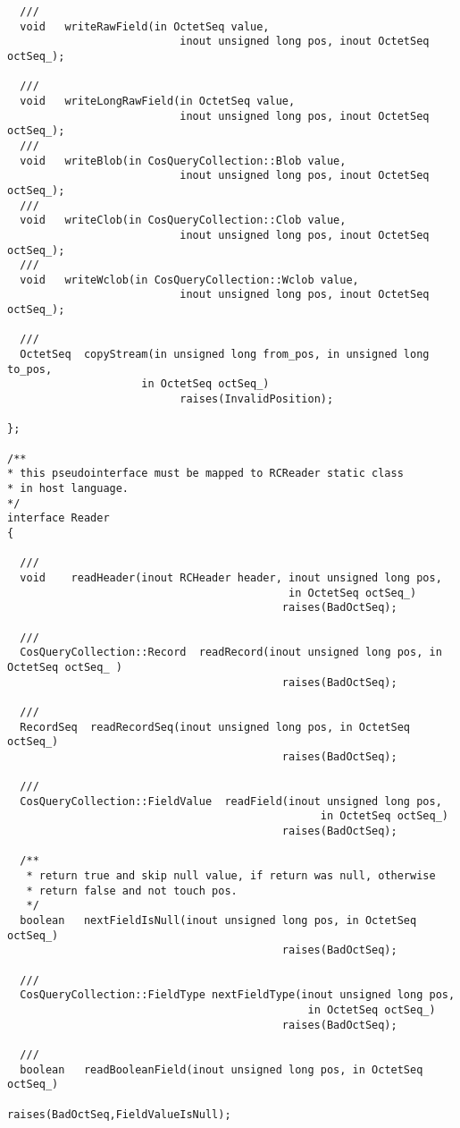 \documentclass[10pt]{article}
\begin{document}
\begin{verbatim}
  ///
  void   writeRawField(in OctetSeq value,
                           inout unsigned long pos, inout OctetSeq octSeq_);

  ///
  void   writeLongRawField(in OctetSeq value,
                           inout unsigned long pos, inout OctetSeq octSeq_);
  ///
  void   writeBlob(in CosQueryCollection::Blob value,
                           inout unsigned long pos, inout OctetSeq octSeq_);
  ///
  void   writeClob(in CosQueryCollection::Clob value,
                           inout unsigned long pos, inout OctetSeq octSeq_);
  ///
  void   writeWclob(in CosQueryCollection::Wclob value,
                           inout unsigned long pos, inout OctetSeq octSeq_);

  ///
  OctetSeq  copyStream(in unsigned long from_pos, in unsigned long to_pos,
                     in OctetSeq octSeq_)
                           raises(InvalidPosition);

};

/**
* this pseudointerface must be mapped to RCReader static class
* in host language.
*/
interface Reader
{

  ///
  void    readHeader(inout RCHeader header, inout unsigned long pos,
                                            in OctetSeq octSeq_)
                                           raises(BadOctSeq);

  ///
  CosQueryCollection::Record  readRecord(inout unsigned long pos, in OctetSeq octSeq_ )
                                           raises(BadOctSeq);

  ///
  RecordSeq  readRecordSeq(inout unsigned long pos, in OctetSeq octSeq_)
                                           raises(BadOctSeq);
   
  ///
  CosQueryCollection::FieldValue  readField(inout unsigned long pos,
                                                 in OctetSeq octSeq_)
                                           raises(BadOctSeq);

  /**
   * return true and skip null value, if return was null, otherwise
   * return false and not touch pos.
   */
  boolean   nextFieldIsNull(inout unsigned long pos, in OctetSeq octSeq_)
                                           raises(BadOctSeq);

  ///
  CosQueryCollection::FieldType nextFieldType(inout unsigned long pos,
                                               in OctetSeq octSeq_)
                                           raises(BadOctSeq);

  ///
  boolean   readBooleanField(inout unsigned long pos, in OctetSeq octSeq_)
                                       raises(BadOctSeq,FieldValueIsNull);


\end{verbatim}
\end{document}

